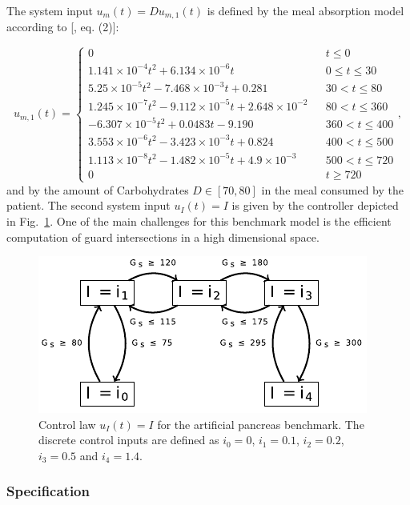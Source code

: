 \documentclass[EPiC]{easychair}
\begin{document}
The system input $u_m(t) = D u_{m,1}(t)$ is defined by the meal absorption model according to [\cite{Chen2017}, eq. (2)]:

\[
u_{m,1}(t) = \left\{
\begin{array}{lcl}
0 & & t \leq 0\\
1.141 \times 10^{-4} t^2 + 6.134 \times 10^{-6} t & & 0 \leq t \leq 30 \\
5.25 \times 10^{-5} t^2 - 7.468 \times 10^{-3} t + 0.281 & & 30 < t \leq 80 \\
1.245 \times 10^{-7} t^2 - 9.112 \times 10^{-5} t + 2.648 \times 10^{-2} & & 80 < t \leq 360 \\
-6.307 \times 10^{-5} t^2 + 0.0483 t -9.190 & & 360 < t \leq 400 \\
3.553 \times 10^{-6} t^2 - 3.423 \times 10^{-3} t + 0.824 & & 400 < t \leq 500 \\
1.113 \times 10^{-8} t^2 - 1.482 \times 10^{-5} t + 4.9 \times 10^{-3} & & 500 < t \leq 720 \\
0 & & t \geq 720
\end{array}
\right.,
\]
and by the amount of Carbohydrates $D \in [70,80]$ in the meal consumed by the patient. The second system input $u_I(t) = I$ is given by the controller depicted in Fig.~\ref{fig:pancreasController}. One of the main challenges for this benchmark model is the efficient computation of guard intersections in a high dimensional space. 

\begin{figure}[htb]
    \centering	
    \scriptsize
	
      \includegraphics[width=0.6\columnwidth]{./figures/pancreasController.pdf}
      \caption{Control law $u_I(t) = I$ for the artificial pancreas benchmark. The discrete control inputs are defined as $i_0 = 0$, $i_1 = 0.1$, $i_2 = 0.2$, $i_3 = 0.5$ and $i_4 = 1.4$.}
      \label{fig:pancreasController}
\end{figure}


\subsubsection{Specification}
\end{document}
